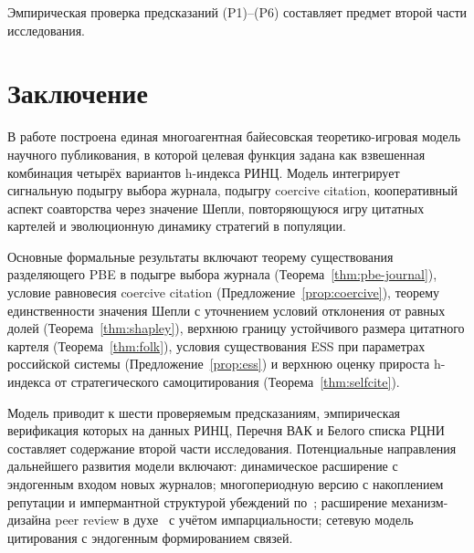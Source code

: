 \documentclass[12pt,a4paper]{article}
\theoremstyle{definition}
\begin{document}
Эмпирическая проверка предсказаний (P1)--(P6) составляет предмет
второй части исследования.

\section{Заключение}
\label{sec:conclusion}

В работе построена единая многоагентная байесовская теоретико-игровая
модель научного публикования, в которой целевая функция задана как
взвешенная комбинация четырёх вариантов h-индекса РИНЦ. Модель
интегрирует сигнальную подыгру выбора журнала, подыгру coercive
citation, кооперативный аспект соавторства через значение Шепли,
повторяющуюся игру цитатных картелей и эволюционную динамику
стратегий в популяции.

Основные формальные результаты включают теорему существования
разделяющего PBE в подыгре выбора журнала
(Теорема~\ref{thm:pbe-journal}), условие равновесия coercive citation
(Предложение~\ref{prop:coercive}), теорему единственности значения
Шепли с уточнением условий отклонения от равных долей
(Теорема~\ref{thm:shapley}), верхнюю границу устойчивого размера
цитатного картеля (Теорема~\ref{thm:folk}), условия существования ESS
при параметрах российской системы (Предложение~\ref{prop:ess}) и
верхнюю оценку прироста h-индекса от стратегического самоцитирования
(Теорема~\ref{thm:selfcite}).

Модель приводит к шести проверяемым предсказаниям, эмпирическая
верификация которых на данных РИНЦ, Перечня ВАК и Белого списка РЦНИ
составляет содержание второй части исследования. Потенциальные
направления дальнейшего развития модели включают: динамическое
расширение с эндогенным входом новых журналов; многопериодную версию
с накоплением репутации и импермантной структурой убеждений
по~\citep{cripps2004}; расширение механизм-дизайна peer review в
духе~\citep{alon2011} с учётом импарциальности; сетевую модель
цитирования с эндогенным формированием связей.



\end{document}
